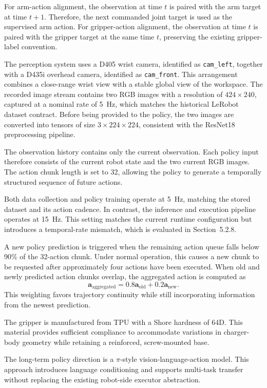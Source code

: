 \documentclass[12pt, letterpaper]{article}
\newcommand{\pistyle}{$\pi$-style}
\begin{document}
For arm-action alignment, the observation at time \(t\) is paired with the arm target at time \(t+1\). Therefore, the next commanded joint target is used as the supervised arm action. For gripper-action alignment, the observation at time \(t\) is paired with the gripper target at the same time \(t\), preserving the existing gripper-label convention.

The perception system uses a D405 wrist camera, identified as \texttt{cam\_left}, together with a D435i overhead camera, identified as \texttt{cam\_front}. This arrangement combines a close-range wrist view with a stable global view of the workspace. The recorded image stream contains two RGB images with a resolution of \(424\times240\), captured at a nominal rate of 5~Hz, which matches the historical LeRobot dataset contract. Before being provided to the policy, the two images are converted into tensors of size \(3\times224\times224\), consistent with the ResNet18 preprocessing pipeline.

The observation history contains only the current observation. Each policy input therefore consists of the current robot state and the two current RGB images. The action chunk length is set to 32, allowing the policy to generate a temporally structured sequence of future actions.

Both data collection and policy training operate at 5~Hz, matching the stored dataset and its action cadence. In contrast, the inference and execution pipeline operates at 15~Hz. This setting matches the current runtime configuration but introduces a temporal-rate mismatch, which is evaluated in Section~5.2.8.

A new policy prediction is triggered when the remaining action queue falls below 90\% of the 32-action chunk. Under normal operation, this causes a new chunk to be requested after approximately four actions have been executed. When old and newly predicted action chunks overlap, the aggregated action is computed as
\[
\mathbf a_{\mathrm{aggregated}}
=
0.8\mathbf a_{\mathrm{old}}
+
0.2\mathbf a_{\mathrm{new}}.
\]
This weighting favors trajectory continuity while still incorporating information from the newest prediction.

The gripper is manufactured from TPU with a Shore hardness of 64D. This material provides sufficient compliance to accommodate variations in charger-body geometry while retaining a reinforced, screw-mounted base.

The long-term policy direction is a \pistyle{} vision-language-action model. This approach introduces language conditioning and supports multi-task transfer without replacing the existing robot-side executor abstraction.
\end{document}
